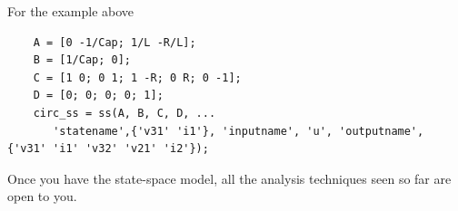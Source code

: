 \begin{slide}
	For the example above
	\begin{verbatim}
	A = [0 -1/Cap; 1/L -R/L];
	B = [1/Cap; 0];
	C = [1 0; 0 1; 1 -R; 0 R; 0 -1];
	D = [0; 0; 0; 0; 1];
	circ_ss = ss(A, B, C, D, ...
	   'statename',{'v31' 'i1'}, 'inputname', 'u', 'outputname', {'v31' 'i1' 'v32' 'v21' 'i2'});	
	\end{verbatim}
	Once you have the state-space model, all the analysis techniques seen so far are open to you.
\end{slide}


\endinput


